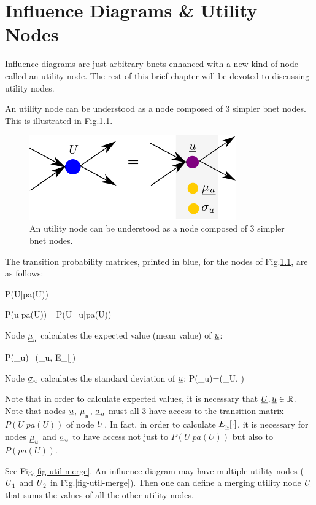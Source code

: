 \chapter{Influence Diagrams \& Utility Nodes}
\label{ch-inf-dia}

Influence diagrams are
just arbitrary bnets
enhanced with a 
new kind of node called an utility node.
The rest
of this brief chapter  will 
be devoted to discussing utility nodes.

An utility node
can be
understood
as a node
composed of 3 simpler bnet nodes.
This
is illustrated in Fig.\ref{fig-util-node}.

\begin{figure}[h!]
\centering
\includegraphics[width=3.5in]
{inf-dia/util-node.png}
\caption{An utility node
can be
understood
as a node 
composed of 3 simpler bnet nodes.} 
\label{fig-util-node}
\end{figure}

The transition probability matrices,
printed in blue,
for the nodes
of Fig.\ref{fig-util-node},
are as follows:

\beq\color{blue}
P(U|pa(U))
\eeq

\beq\color{blue}
P(u|pa(U))=
P(U=u|pa(U))
\eeq

Node $\underline{\mu}_u$
calculates the
expected value (mean value) of ${\underline{u}}$:

\beq\color{blue}
P(\mu_u)=\delta(\mu_u,
E_{\rvu}[\rvu])
\eeq

Node $\underline{\sigma}_u$
calculates the
standard deviation of ${\underline{u}}$:
\beq\color{blue}
P(\sigma_u)=\delta(\sigma_U,
)
\eeq

Note that in order to
calculate expected values,
it is necessary that
${\underline{U}}, {\underline{u}}\in { \mathbb{R}}$. Note that
nodes ${\underline{u}}$, $\underline{\mu}_u$, $\underline{\sigma}_u$
must all 3 have access
to the 
transition matrix
$P(U|pa(U))$ of node ${\underline{U}}$.
In fact, in order  to
calculate $E_{\underline{u}}[\cdot]$,
it is necessary for
nodes $\underline{\mu}_u$ and 
 $\underline{\sigma}_u$
to have access not just to 
$P(U|pa(U))$ but also to
$P(pa(U))$.

See Fig.\ref{fig-util-merge}.
An influence
diagram may have multiple
utility nodes (${\underline{U}}_1$ and
${\underline{U}}_2$ in Fig.\ref{fig-util-merge}).
Then one can define a merging
utility node ${\underline{U}}$ that sums
the values of
all the other utility 
nodes.

